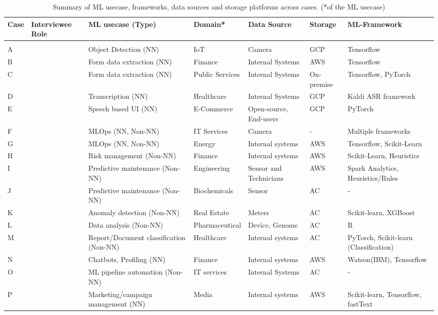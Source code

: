 

\begin{table*}[t]
 \centering
  \caption{Summary of ML usecase, frameworks, data sources and storage platforms across cases. (*of the ML usecase)}
  \begin{tabular}{p{}p{2cm}p{}p{}p{2cm}p{1cm}p{}}
    \toprule
    \textbf{Case} & \textbf{Interviewee Role} & \textbf{ML usecase (Type)} & \textbf{Domain*} &\textbf{Data Source} & \textbf{Storage} & \textbf{ML-Framework} \\
    \toprule \\
    A & & Object Detection (NN) & IoT & Camera & GCP & Tensorflow \\
    B & & Form data extraction  (NN) & Finance & Internal Systems & AWS & Tensorflow \\
    C & & Form data extraction (NN) & Public Services & Internal Systems & On-premise & Tensorflow, PyTorch \\
    D & & Transcription (NN) & Healthcare & Internal Systems & GCP & Kaldi ASR framework \\
    E & & Speech based UI (NN) & E-Commerce & Open-source, End-users & GCP & PyTorch \\
   F & & MLOps (NN, Non-NN) & IT Services & Camera  & - & Multiple frameworks \\
    G & & MLOps (NN, Non-NN)  & Energy & Internal systems & AWS & Tensorflow, Scikit-Learn \\
    H & & Risk management (Non-NN) & Finance & Internal systems & AWS & Scikit-Learn, Heuristics \\
    I & & Predictive maintenance (Non-NN) & Engineering & Sensor and Technicians & AWS &  Spark Analytics, Heuristics/Rules \\
    J & & Predictive maintenance (Non-NN) & Biochemicals & Sensor & AC & - \\
    K & & Anomaly detection (Non-NN) & Real Estate & Meters & AC & Scikit-learn, XGBoost \\
    L & & Data analysis (Non-NN) & Pharmaceutical & Device,  Genome & AC & R \\
    M & & Report/Document classification (Non-NN) & Healthcare & Internal systems & AC & PyTorch, Scikit-learn (Classification) \\
    N & & Chatbots, Profiling (NN) & Finance & Internal systems & AWS & Watson(IBM), Tensorflow \\
    O & & ML pipeline automation (Non-NN) & IT services & Internal Systems & AC & - \\
    P && Marketing/campaign management (NN) & Media & Internal systems & AWS & Scikit-learn, Tensorflow, fastText \\
    \hline
    

\end{tabular}
\end{table*}
